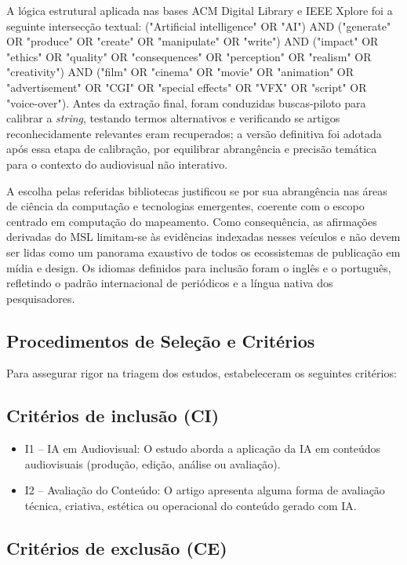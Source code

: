 A lógica estrutural aplicada nas bases ACM Digital Library e IEEE Xplore foi a seguinte intersecção textual: ("Artificial intelligence" OR "AI") AND ("generate" OR "produce" OR "create" OR "manipulate" OR "write") AND ("impact" OR "ethics" OR "quality" OR "consequences" OR "perception" OR "realism" OR "creativity") AND ("film" OR "cinema" OR "movie" OR "animation" OR "advertisement" OR "CGI" OR "special effects" OR "VFX" OR "script" OR "voice-over"). Antes da extração final, foram conduzidas buscas-piloto para calibrar a \textit{string}, testando termos alternativos e verificando se artigos reconhecidamente relevantes eram recuperados; a versão definitiva foi adotada após essa etapa de calibração, por equilibrar abrangência e precisão temática para o contexto do audiovisual não interativo.

A escolha pelas referidas bibliotecas justificou se por sua abrangência nas áreas de ciência da computação e tecnologias emergentes, coerente com o escopo centrado em computação do mapeamento. Como consequência, as afirmações derivadas do MSL limitam-se às evidências indexadas nesses veículos e não devem ser lidas como um panorama exaustivo de todos os ecossistemas de publicação em mídia e design. Os idiomas definidos para inclusão foram o inglês e o português, refletindo o padrão internacional de periódicos e a língua nativa dos pesquisadores.

\subsection{Procedimentos de Seleção e Critérios}

Para assegurar rigor na triagem dos estudos, \citet{RothAleo2026} estabeleceram os seguintes critérios:

\subsection{Critérios de inclusão (CI)}

\begin{itemize}
    \item I1 – IA em Audiovisual: O estudo aborda a aplicação da IA em conteúdos audiovisuais (produção, edição, análise ou avaliação).
    \item I2 – Avaliação do Conteúdo: O artigo apresenta alguma forma de avaliação técnica, criativa, estética ou operacional do conteúdo gerado com IA.
\end{itemize}

\subsection{Critérios de exclusão (CE)}


